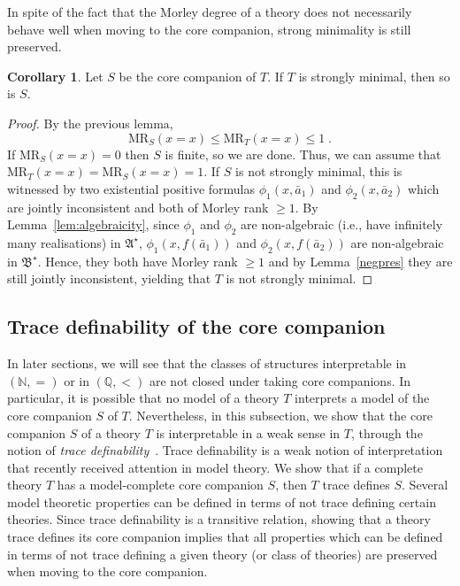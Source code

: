 \documentclass{amsart}
\theoremstyle{definition}
\newtheorem{corollary}[theorem]{Corollary}
\theoremstyle{remark}
\numberwithin{equation}{section}
\newcommand\green[1]{\textcolor{green!50!black}{#1}}
\newcommand{\RM}{\mathrm{MR}}
\newcommand{\fa}{\mathfrak{A}}
\newcommand{\fb}{\mathfrak{B}}
\begin{document}
	In spite of the fact that the Morley degree of a theory does not necessarily behave well when moving to the core companion, strong minimality is still preserved.

\begin{corollary} 
	Let $S$ be the core companion  of $T$.  If $T$ is strongly minimal, then so is $S$.
\end{corollary}
\begin{proof} By the previous lemma, 
\[\RM_S(x=x)\leq \RM_T(x=x)\leq 1\;.\]
If $\RM_S(x=x)=0$ then $S$ is finite, so we are done. Thus, we can assume that $\RM_T(x=x)={\RM_S(x=x)}=1$. If $S$ is not strongly minimal, this is witnessed by two existential positive formulas $\phi_1(x,\bar{a}_1)$ and $\phi_2(x,\bar{a}_2)$ which are jointly inconsistent and both of Morley rank $\geq 1$. By Lemma~\ref{lem:algebraicity}, since $\phi_1$ and $\phi_2$ are non-algebraic (i.e., have infinitely many realisations) in $\fa^\star$, $\phi_1(x,f(\bar{a}_1))$ and $\phi_2(x,f(\bar{a}_2))$ are non-algebraic in $\fb^\star$. Hence, they both have Morley rank $\geq 1$ and by Lemma~\ref{negpres} they are still jointly inconsistent, yielding that $T$ is not strongly minimal. 
\end{proof}






\subsection{Trace definability of the core companion}\label{sub:trace}
In later sections, we will see that the {classes} of structures interpretable in $(\mathbb{N}, =)$ or in $(\mathbb{Q}, <)$ are not closed under taking core companions. In particular, it is possible that no model of a theory $T$ interprets a model of the core companion  $S$ {of $T$}. Nevertheless, in this subsection, we show that the core companion $S$ of a theory $T$ is interpretable in a weak sense in $T$, through the notion of \emph{trace definability}~\cite{Walsbergshort, Walsberglong}. Trace definability is a weak notion of interpretation that recently received attention in model theory.
We show that if a complete theory $T$ has a {model-complete} core companion $S$, then $T$ trace defines $S$. Several model theoretic properties can be defined in terms of not trace defining certain theories. Since trace definability is a transitive relation, showing that a theory trace defines its core companion  implies that all properties which can be defined in terms of not trace defining a given theory (or class of theories) are preserved when moving to the core companion.
\end{document}
